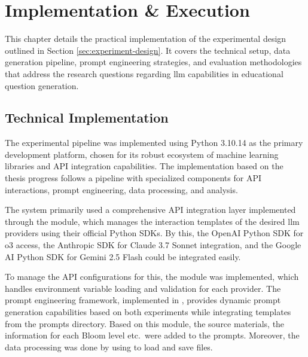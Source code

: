 \section{Implementation \& Execution} 
\label{sec:implementation-and-execution}

This chapter details the practical implementation of the experimental design outlined in Section \ref{sec:experiment-design}. It covers the technical setup, data generation pipeline, prompt engineering strategies, and evaluation methodologies that address the research questions regarding \ac{llm} capabilities in educational question generation.

\subsection{Technical Implementation}

The experimental pipeline was implemented using Python 3.10.14 as the primary development platform, chosen for its robust ecosystem of machine learning libraries and API integration capabilities. The implementation based on the thesis progress follows a pipeline with specialized components for API interactions, prompt engineering, data processing, and analysis.

The system primarily used a comprehensive API integration layer implemented through the  module, which manages the interaction templates of the desired \ac{llm} providers using their official Python SDKs. By this, the OpenAI Python SDK for o3 access, the Anthropic SDK for Claude 3.7 Sonnet integration, and the Google AI Python SDK for Gemini 2.5 Flash could be integrated easily.

To manage the API configurations for this, the  module was implemented, which handles environment variable loading and validation for each provider. The prompt engineering framework, implemented in , provides dynamic prompt generation capabilities based on both experiments while integrating templates from the prompts directory. Based on this module, the source materials, the information for each Bloom level etc.\ were added to the prompts. Moreover, the data processing was done by using  to load and save files.

